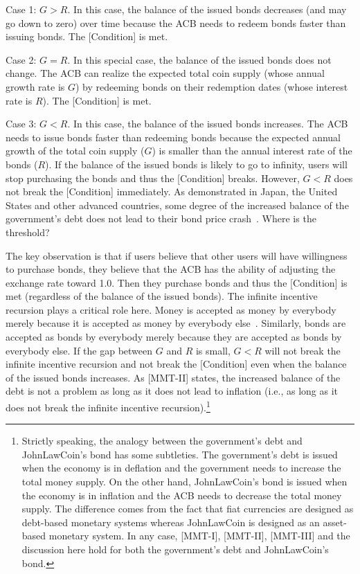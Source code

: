 \documentclass[dvipdfmx,a4paper]{article}
\begin{document}
Case 1: $G>R$. In this case, the balance of the issued bonds decreases (and may go down to zero) over time because the ACB needs to redeem bonds faster than issuing bonds. The [Condition] is met.

Case 2: $G=R$. In this special case, the balance of the issued bonds does not change. The ACB can realize the expected total coin supply (whose annual growth rate is $G$) by redeeming bonds on their redemption dates (whose interest rate is $R$). The [Condition] is met.

Case 3: $G<R$. In this case, the balance of the issued bonds increases. The ACB needs to issue bonds faster than redeeming bonds because the expected annual growth of the total coin supply ($G$) is smaller than the annual interest rate of the bonds ($R$). If the balance of the issued bonds is likely to go to infinity, users will stop purchasing the bonds and thus the [Condition] breaks. However, $G<R$ does not break the [Condition] immediately. As demonstrated in Japan, the United States and other advanced countries, some degree of the increased balance of the government's debt does not lead to their bond price crash~\cite{elmendorf1999government}. Where is the threshold?

The key observation is that if users believe that other users will have willingness to purchase bonds, they believe that the ACB has the ability of adjusting the exchange rate toward 1.0. Then they purchase bonds and thus the [Condition] is met (regardless of the balance of the issued bonds). The infinite incentive recursion plays a critical role here. Money is accepted as money by everybody merely because it is accepted as money by everybody else~\cite{iwai1996boostrap,iwai1997evolution}. Similarly, bonds are accepted as bonds by everybody merely because they are accepted as bonds by everybody else. If the gap between $G$ and $R$ is small, $G<R$ will not break the infinite incentive recursion and not break the [Condition] even when the balance of the issued bonds increases. As [MMT-II] states, the increased balance of the debt is not a problem as long as it does not lead to inflation (i.e., as long as it does not break the infinite incentive recursion).\footnote{Strictly speaking, the analogy between the government's debt and JohnLawCoin's bond has some subtleties. The government's debt is issued when the economy is in deflation and the government needs to increase the total money supply. On the other hand, JohnLawCoin's bond is issued when the economy is in inflation and the ACB needs to decrease the total money supply. The difference comes from the fact that fiat currencies are designed as debt-based monetary systems whereas JohnLawCoin is designed as an asset-based monetary system. In any case, [MMT-I], [MMT-II], [MMT-III] and the discussion here hold for both the government's debt and JohnLawCoin's bond.}
\end{document}
